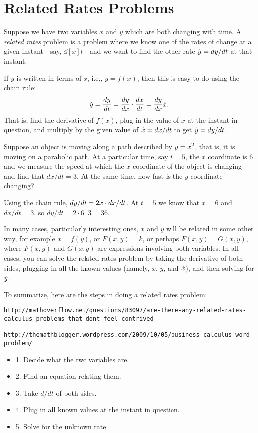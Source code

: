 \section{Related Rates Problems}

Suppose we have two variables $x$ and $y$ which are both changing with
time.  A \textit{related rates} problem is a problem where we know one
of the rates of change at a given instant---say, $\dd[x]{t}$---and we
want to find the other rate $\displaystyle \dot y = dy/dt$ at that instant.

If $y$ is written in terms of $x$, i.e., $y=f(x)$, then this is easy
to do using the chain rule:
\[
\dot y = {dy\over dt}={dy\over dx}\cdot{dx\over dt}={dy\over dx}\dot x.
\]
That is, find the derivative of $f(x)$, plug in the value of
$x$ at the instant in question, and multiply by the given value of
$\displaystyle \dot{x}=dx/dt$ to get $\displaystyle \dot{y}=dy/dt$.

\begin{example}
Suppose an object is moving along a path described by $\displaystyle y=x^2$, that
is, it is moving on a parabolic path. At a particular time, say $t=5$,
the $x$ coordinate is 6 and 
we measure the speed at which the $x$ coordinate of the object is
changing and find that $dx/dt = 3$. At the same time, how fast is the
$y$ coordinate changing?

Using the chain rule, $\displaystyle dy/dt = 2x\cdot dx/dt$. At $t=5$ we know that
$x=6$ and $dx/dt=3$, so $dy/dt = 2\cdot 6\cdot 3 = 36$.
\end{example}

In many cases, particularly interesting ones,
$x$ and $y$ will be related in some other way, for example
$x=f(y)$, or $F(x,y)=k$, or perhaps $F(x,y)=G(x,y)$, where $F(x,y)$
and $G(x,y)$ are expressions involving both variables.  In all cases, you
can solve the related rates problem by taking the derivative of both sides,
plugging in all the known values (namely, $x$, $y$, and $\displaystyle \dot{x}$), and
then solving for $\displaystyle \dot{y}$.

To summarize, here are the steps in doing a related rates problem:


\begin{verbatim}
http://mathoverflow.net/questions/83097/are-there-any-related-rates-calculus-problems-that-dont-feel-contrived

http://themathblogger.wordpress.com/2009/10/05/business-calculus-word-problem/
\end{verbatim}


\begin{itemize} %

\item{1.} Decide what the two variables are.
\item{2.}  Find an equation relating them.
\item{3.}  Take $d/dt$ of both sides.
\item{4.}  Plug in all known values at the instant in question.
\item{5.}  Solve for the unknown rate.

\end{itemize}

